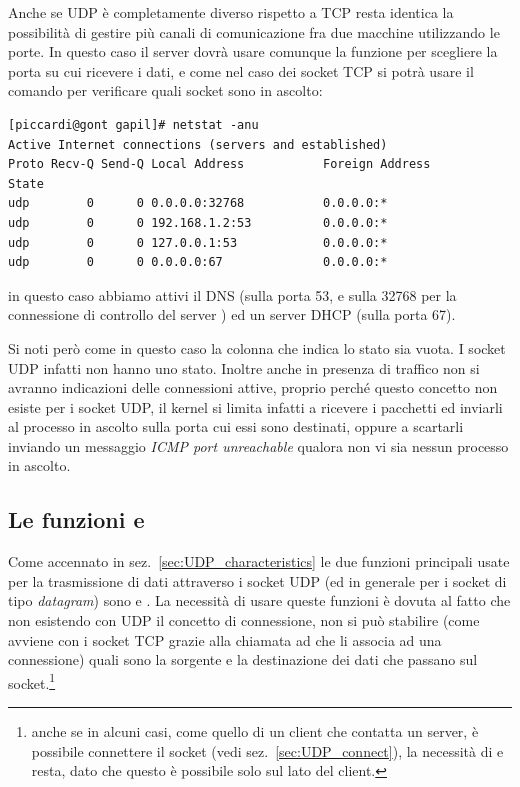 Anche se UDP è completamente diverso rispetto a TCP resta identica la
possibilità di gestire più canali di comunicazione fra due macchine
utilizzando le porte. In questo caso il server dovrà usare comunque la
funzione  per scegliere la porta su cui ricevere i dati, e come nel
caso dei socket TCP si potrà usare il comando  per
verificare quali socket sono in ascolto:
\begin{verbatim}
[piccardi@gont gapil]# netstat -anu
Active Internet connections (servers and established)
Proto Recv-Q Send-Q Local Address           Foreign Address         State
udp        0      0 0.0.0.0:32768           0.0.0.0:*
udp        0      0 192.168.1.2:53          0.0.0.0:*
udp        0      0 127.0.0.1:53            0.0.0.0:*
udp        0      0 0.0.0.0:67              0.0.0.0:*
\end{verbatim}
in questo caso abbiamo attivi il DNS (sulla porta 53, e sulla 32768 per la
connessione di controllo del server ) ed un server DHCP (sulla
porta 67).

Si noti però come in questo caso la colonna che indica lo stato sia vuota. I
socket UDP infatti non hanno uno stato. Inoltre anche in presenza di traffico
non si avranno indicazioni delle connessioni attive, proprio perché questo
concetto non esiste per i socket UDP, il kernel si limita infatti a ricevere i
pacchetti ed inviarli al processo in ascolto sulla porta cui essi sono
destinati, oppure a scartarli inviando un messaggio \textit{ICMP port
  unreachable} qualora non vi sia nessun processo in ascolto.


\subsection{Le funzioni  e }
\label{sec:UDP_sendto_recvfrom}

Come accennato in sez.~\ref{sec:UDP_characteristics} le due funzioni
principali usate per la trasmissione di dati attraverso i socket UDP (ed in
generale per i socket di tipo \textit{datagram}) sono  e
. La necessità di usare queste funzioni è dovuta al fatto che
non esistendo con UDP il concetto di connessione, non si può stabilire (come
avviene con i socket TCP grazie alla chiamata ad  che li associa
ad una connessione) quali sono la sorgente e la destinazione dei dati che
passano sul socket.\footnote{anche se in alcuni casi, come quello di un client
  che contatta un server, è possibile connettere il socket (vedi
  sez.~\ref{sec:UDP_connect}), la necessità di  e 
  resta, dato che questo è possibile solo sul lato del client.}

